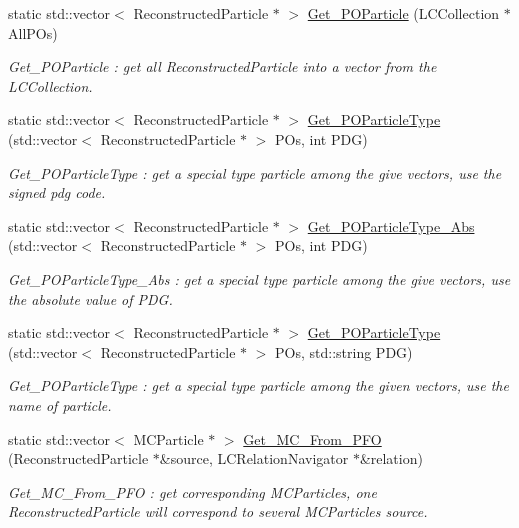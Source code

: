 \begin{DoxyCompactItemize}
static std::vector$<$ ReconstructedParticle $\ast$ $>$ \hyperlink{classToolSet_1_1CRC_acc5d3da66cadce82d9981f5b24a1c91a}{Get\_\-POParticle} (LCCollection $\ast$AllPOs)
\begin{DoxyCompactList}\small\item\em Get\_\-POParticle : get all ReconstructedParticle into a vector from the LCCollection. \item\end{DoxyCompactList}\item 
static std::vector$<$ ReconstructedParticle $\ast$ $>$ \hyperlink{classToolSet_1_1CRC_ad8b6c46ab37661892183c313d5c0b3b3}{Get\_\-POParticleType} (std::vector$<$ ReconstructedParticle $\ast$ $>$ POs, int PDG)
\begin{DoxyCompactList}\small\item\em Get\_\-POParticleType : get a special type particle among the give vectors, use the signed pdg code. \item\end{DoxyCompactList}\item 
static std::vector$<$ ReconstructedParticle $\ast$ $>$ \hyperlink{classToolSet_1_1CRC_ad0f9459b95ec7aae88c527b360cbcc3c}{Get\_\-POParticleType\_\-Abs} (std::vector$<$ ReconstructedParticle $\ast$ $>$ POs, int PDG)
\begin{DoxyCompactList}\small\item\em Get\_\-POParticleType\_\-Abs : get a special type particle among the give vectors, use the absolute value of PDG. \item\end{DoxyCompactList}\item 
static std::vector$<$ ReconstructedParticle $\ast$ $>$ \hyperlink{classToolSet_1_1CRC_a6250a525d48e3828cdc6d1544b3f7000}{Get\_\-POParticleType} (std::vector$<$ ReconstructedParticle $\ast$ $>$ POs, std::string PDG)
\begin{DoxyCompactList}\small\item\em Get\_\-POParticleType : get a special type particle among the given vectors, use the name of particle. \item\end{DoxyCompactList}\item 
static std::vector$<$ MCParticle $\ast$ $>$ \hyperlink{classToolSet_1_1CRC_ab931816f16f8767329774a8309709d3c}{Get\_\-MC\_\-From\_\-PFO} (ReconstructedParticle $\ast$\&source, LCRelationNavigator $\ast$\&relation)
\begin{DoxyCompactList}\small\item\em Get\_\-MC\_\-From\_\-PFO : get corresponding MCParticles, one ReconstructedParticle will correspond to several MCParticles source. \item\end{DoxyCompactList}\item 

\end{DoxyCompactItemize}
